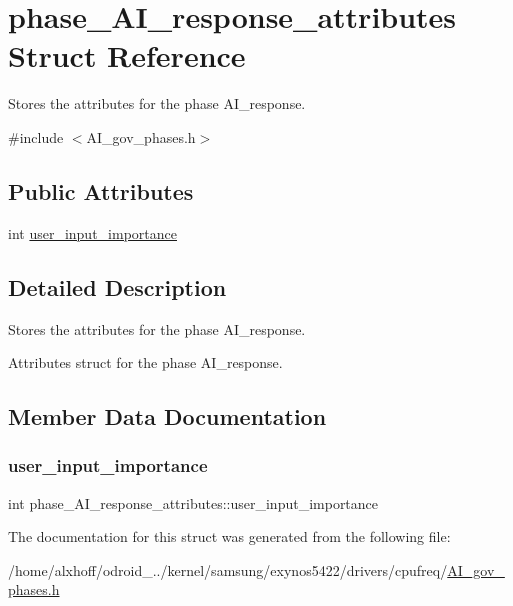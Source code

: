 \hypertarget{structphase__AI__response__attributes}{}\section{phase\+\_\+\+A\+I\+\_\+response\+\_\+attributes Struct Reference}
\label{structphase__AI__response__attributes}


Stores the attributes for the phase A\+I\+\_\+response.  




{\ttfamily \#include $<$A\+I\+\_\+gov\+\_\+phases.\+h$>$}

\subsection*{Public Attributes}
\begin{DoxyCompactItemize}
\item 
int \hyperlink{structphase__AI__response__attributes_ad10aa4d1781d5498fcf099274e13dce7}{user\+\_\+input\+\_\+importance}
\end{DoxyCompactItemize}


\subsection{Detailed Description}
Stores the attributes for the phase A\+I\+\_\+response. 

Attributes struct for the phase A\+I\+\_\+response. 

\subsection{Member Data Documentation}
\mbox{\label{structphase__AI__response__attributes_ad10aa4d1781d5498fcf099274e13dce7}} 
\subsubsection{\texorpdfstring{user\+\_\+input\+\_\+importance}{user\_input\_importance}}
{\footnotesize\ttfamily int phase\+\_\+\+A\+I\+\_\+response\+\_\+attributes\+::user\+\_\+input\+\_\+importance}



The documentation for this struct was generated from the following file\+:\begin{DoxyCompactItemize}
\item 
/home/alxhoff/odroid\+\_../kernel/samsung/exynos5422/drivers/cpufreq/\hyperlink{AI__gov__phases_8h}{A\+I\+\_\+gov\+\_\+phases.\+h}\end{DoxyCompactItemize}
